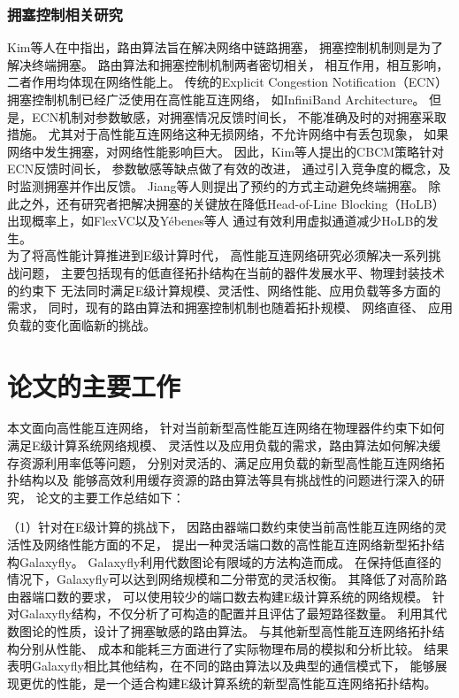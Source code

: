 \subsubsection{拥塞控制相关研究}
Kim等人在中指出，路由算法旨在解决网络中链路拥塞，
拥塞控制机制则是为了解决终端拥塞。
路由算法和拥塞控制机制两者密切相关，
相互作用，相互影响，二者作用均体现在网络性能上。
传统的Explicit Congestion Notification（ECN）
拥塞控制机制已经广泛使用在高性能互连网络，
如InfiniBand Architecture。
但是，ECN机制对参数敏感，对拥塞情况反馈时间长，
不能准确及时的对拥塞采取措施。
尤其对于高性能互连网络这种无损网络，不允许网络中有丢包现象，
如果网络中发生拥塞，对网络性能影响巨大。
因此，Kim等人提出的CBCM策略针对ECN反馈时间长，
参数敏感等缺点做了有效的改进，
通过引入竞争度的概念，及时监测拥塞并作出反馈。
Jiang等人则提出了预约的方式主动避免终端拥塞。
除此之外，还有研究者把解决拥塞的关键放在降低Head-of-Line Blocking（HoLB）
出现概率上，如FlexVC以及Y\'ebenes等人
通过有效利用虚拟通道减少HoLB的发生。
\\                              %

为了将高性能计算推进到E级计算时代，
高性能互连网络研究必须解决一系列挑战问题，
主要包括现有的低直径拓扑结构在当前的器件发展水平、物理封装技术的约束下
无法同时满足E级计算规模、灵活性、网络性能、应用负载等多方面的需求，
同时，现有的路由算法和拥塞控制机制也随着拓扑规模、
网络直径、 应用负载的变化面临新的挑战。


\section{论文的主要工作}
本文面向高性能互连网络，
针对当前新型高性能互连网络在物理器件约束下如何满足E级计算系统网络规模、
灵活性以及应用负载的需求，路由算法如何解决缓存资源利用率低等问题，
分别对灵活的、满足应用负载的新型高性能互连网络拓扑结构以及
能够高效利用缓存资源的路由算法等具有挑战性的问题进行深入的研究，
论文的主要工作总结如下：

（1）针对在E级计算的挑战下，
因路由器端口数约束使当前高性能互连网络的灵活性及网络性能方面的不足，
提出一种灵活端口数的高性能互连网络新型拓扑结构Galaxyfly。
Galaxyfly利用代数图论有限域的方法构造而成。
在保持低直径的情况下，Galaxyfly可以达到网络规模和二分带宽的灵活权衡。
其降低了对高阶路由器端口数的要求，
可以使用较少的端口数去构建E级计算系统的网络规模。
针对Galaxyfly结构，不仅分析了可构造的配置并且评估了最短路径数量。
利用其代数图论的性质，设计了拥塞敏感的路由算法。
与其他新型高性能互连网络拓扑结构分别从性能、
成本和能耗三方面进行了实际物理布局的模拟和分析比较。
结果表明Galaxyfly相比其他结构，在不同的路由算法以及典型的通信模式下，
能够展现更优的性能，是一个适合构建E级计算系统的新型高性能互连网络拓扑结构。

